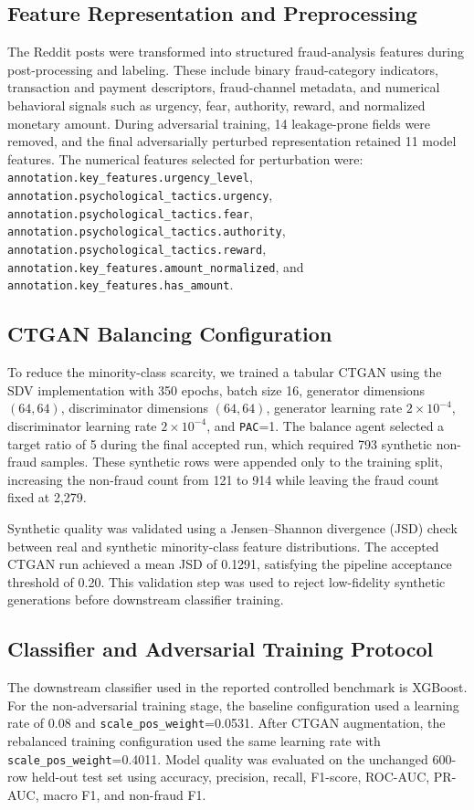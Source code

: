\documentclass[conference]{IEEEtran}
\begin{document}
\subsection{Feature Representation and Preprocessing}
The Reddit posts were transformed into structured fraud-analysis features during post-processing and labeling. These include binary fraud-category indicators, transaction and payment descriptors, fraud-channel metadata, and numerical behavioral signals such as urgency, fear, authority, reward, and normalized monetary amount. During adversarial training, 14 leakage-prone fields were removed, and the final adversarially perturbed representation retained 11 model features. The numerical features selected for perturbation were: \texttt{annotation.key\_features.urgency\_level}, \texttt{annotation.psychological\_tactics.urgency}, \texttt{annotation.psychological\_tactics.fear}, \texttt{annotation.psychological\_tactics.authority}, \texttt{annotation.psychological\_tactics.reward}, \texttt{annotation.key\_features.amount\_normalized}, and \texttt{annotation.key\_features.has\_amount}.

\subsection{CTGAN Balancing Configuration}
To reduce the minority-class scarcity, we trained a tabular CTGAN using the SDV implementation with 350 epochs, batch size 16, generator dimensions $(64, 64)$, discriminator dimensions $(64, 64)$, generator learning rate $2\times10^{-4}$, discriminator learning rate $2\times10^{-4}$, and \texttt{PAC}=1. The balance agent selected a target ratio of 5 during the final accepted run, which required 793 synthetic non-fraud samples. These synthetic rows were appended only to the training split, increasing the non-fraud count from 121 to 914 while leaving the fraud count fixed at 2,279.

Synthetic quality was validated using a Jensen--Shannon divergence (JSD) check between real and synthetic minority-class feature distributions. The accepted CTGAN run achieved a mean JSD of 0.1291, satisfying the pipeline acceptance threshold of 0.20. This validation step was used to reject low-fidelity synthetic generations before downstream classifier training.

\subsection{Classifier and Adversarial Training Protocol}
The downstream classifier used in the reported controlled benchmark is XGBoost. For the non-adversarial training stage, the baseline configuration used a learning rate of 0.08 and \texttt{scale\_pos\_weight}=0.0531. After CTGAN augmentation, the rebalanced training configuration used the same learning rate with \texttt{scale\_pos\_weight}=0.4011. Model quality was evaluated on the unchanged 600-row held-out test set using accuracy, precision, recall, F1-score, ROC-AUC, PR-AUC, macro F1, and non-fraud F1.
\end{document}

